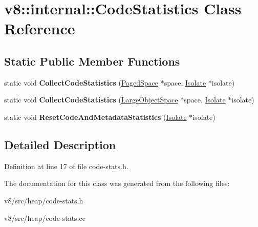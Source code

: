 \hypertarget{classv8_1_1internal_1_1CodeStatistics}{}\section{v8\+:\+:internal\+:\+:Code\+Statistics Class Reference}
\label{classv8_1_1internal_1_1CodeStatistics}
\subsection*{Static Public Member Functions}
\begin{DoxyCompactItemize}
\item 
\mbox{\label{classv8_1_1internal_1_1CodeStatistics_ab5b66ed3366a7886e6cef1359a377414}} 
static void {\bfseries Collect\+Code\+Statistics} (\mbox{\hyperlink{classv8_1_1internal_1_1PagedSpace}{Paged\+Space}} $\ast$space, \mbox{\hyperlink{classv8_1_1internal_1_1Isolate}{Isolate}} $\ast$isolate)
\item 
\mbox{\label{classv8_1_1internal_1_1CodeStatistics_aaeb4d7ee7331b39cf7787695148594d3}} 
static void {\bfseries Collect\+Code\+Statistics} (\mbox{\hyperlink{classv8_1_1internal_1_1LargeObjectSpace}{Large\+Object\+Space}} $\ast$space, \mbox{\hyperlink{classv8_1_1internal_1_1Isolate}{Isolate}} $\ast$isolate)
\item 
\mbox{\label{classv8_1_1internal_1_1CodeStatistics_a915f2dc302e3a5142367c910b6e0b344}} 
static void {\bfseries Reset\+Code\+And\+Metadata\+Statistics} (\mbox{\hyperlink{classv8_1_1internal_1_1Isolate}{Isolate}} $\ast$isolate)
\end{DoxyCompactItemize}


\subsection{Detailed Description}


Definition at line 17 of file code-\/stats.\+h.



The documentation for this class was generated from the following files\+:\begin{DoxyCompactItemize}
\item 
v8/src/heap/code-\/stats.\+h\item 
v8/src/heap/code-\/stats.\+cc\end{DoxyCompactItemize}
